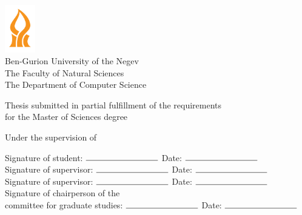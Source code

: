 \begin{titlepage}
    \begin{center}
    \doublespacing

        \vspace*{1cm}
        
        \includegraphics[width=0.1\textwidth]{01Cover/Images/bgu.png}\\
        Ben-Gurion University of the Negev\\
        The Faculty of Natural Sciences\\
        The Department of Computer Science
        
        \vspace{1cm}
        
        {\Large \thesistitle}
        
        \vspace{0.5cm}
        
        Thesis submitted in partial fulfillment of the requirements\\for the Master of Sciences degree
        
        \vspace{0.5cm}
        
        \thesisauthorname
        
        \vspace{0.5cm}
        
        Under the supervision of \thesissupervisername
        
        \vspace{0.5cm}
        
        \begin{flushleft}
        Signature of student: \( \rule{3cm}{0.15mm} \) \hfill Date: \( \rule{3cm}{0.15mm} \)\\
        Signature of supervisor: \( \rule{3cm}{0.15mm} \) \hfill Date: \( \rule{3cm}{0.15mm} \)\\
        Signature of supervisor: \( \rule{3cm}{0.15mm} \) \hfill Date: \( \rule{3cm}{0.15mm} \)\\
        Signature of chairperson of the\\committee for graduate studies: \( \rule{3cm}{0.15mm} \) \hfill Date: \( \rule{3cm}{0.15mm} \)
        \end{flushleft}
        
        \vfill
        
        \thesismonth \quad \thesisyear
    \end{center}
\end{titlepage}